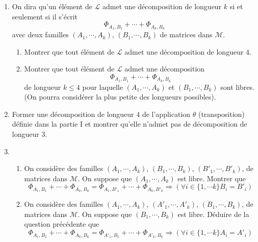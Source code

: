 \begin{enumerate}
\item On dira qu'un élément de $\mathcal L$ admet une décomposition de longueur $k$ si et seulement si il  s'écrit
\begin{displaymath}
\Phi_{A_1,B_1} + \cdots + \Phi_{A_k,B_k} 
\end{displaymath}
avec deux familles $(A_1,\cdots,A_k)$, $(B_1,\cdots,B_k)$ de matrices dans $\mathcal{M}$.
\begin{enumerate}
 \item Montrer que tout élément de $\mathcal{L}$ admet une décomposition de longueur $4$.
 \item Montrer que tout élément de $\mathcal{L}$ admet une décomposition 
\begin{displaymath}
\Phi_{A_1,B_1} + \cdots + \Phi_{A_k,B_k} 
\end{displaymath}
de longueur $k\leq 4$ pour laquelle $(A_1,\cdots,A_k)$ et $(B_1,\cdots,B_k)$ sont libres. (On pourra considérer la plus petite des longueurs possibles).
\end{enumerate}
\item Former une décomposition de longueur $4$ de l'application $\theta$ (transposition) définie dans la partie I et montrer qu'elle n'admet pas de décomposition de longueur $3$. 
\item 
\begin{enumerate}
 \item On considère des familles $(A_1,\cdots,A_k)$, $(B_1,\cdots,B_k)$, $(B'_1,\cdots,B'_k)$, de matrices dans $\mathcal{M}$. On suppose que $(A_1,\cdots,A_k)$ est libre. Montrer que
\begin{displaymath}
 \Phi_{A_1,B_1} + \cdots + \Phi_{A_k,B_k} = \Phi_{A_1,B'_1} + \cdots + \Phi_{A_k,B'_k}\Rightarrow
\left(\forall i\in\{1,\cdots k \} B_i = B'_i\right) 
\end{displaymath}
 \item On considère des familles $(A_1,\cdots,A_k)$, $(A'_1,\cdots,A'_k)$, $(B_1,\cdots,B_k)$, de matrices dans $\mathcal{M}$. On suppose que $(B_1,\cdots,B_k)$ est libre. Déduire de la question précédente que
\begin{displaymath}
 \Phi_{A_1,B_1} + \cdots + \Phi_{A_k,B_k} = \Phi_{A'_1,B_1} + \cdots + \Phi_{A'_k,B_k}\Rightarrow
\left(\forall i\in\{1,\cdots k \} A_i = A'_i\right) 
\end{displaymath}
\end{enumerate}
\end{enumerate}

